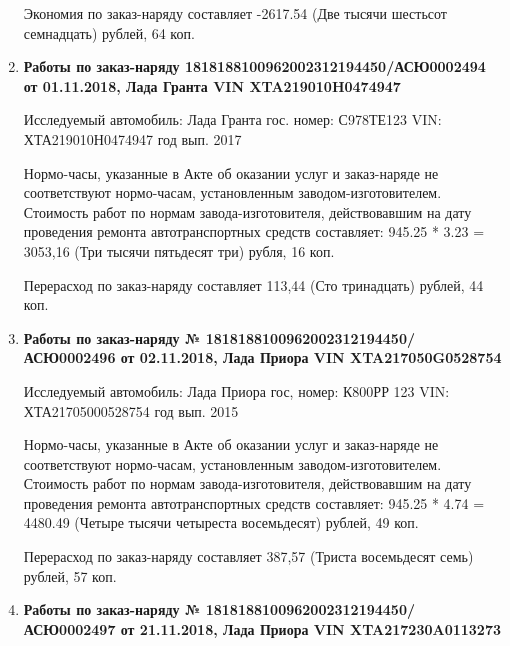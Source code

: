 \begin{enumerate}
Экономия по заказ-наряду составляет -2617.54 (Две тысячи шестьсот семнадцать) рублей, 64 коп.  
\vspace{3mm}




\item \par\textbf{{Работы по заказ-наряду 1818188100962002312194450/\-АСЮ0002494 от 01.11.2018, Лада Гранта VIN XTA219010H0474947}}

Исследуемый автомобиль:  Лада Гранта гос. номер: С978ТЕ123 VIN: ХТА219010Н0474947 год вып. 2017



Нормо-часы, указанные в Акте об оказании услуг и заказ-наряде не соответствуют нормо-часам,  установленным заводом-изготовителем.\\
Стоимость работ по нормам завода-изготовителя, действовавшим на дату проведения ремонта автотранспортных средств составляет: 945.25 * 3.23 = 3053,16 (Три тысячи пятьдесят три) рубля, 16 коп.

Перерасход по заказ-наряду составляет 113,44 (Сто тринадцать) рублей, 44 коп.  
\vspace{3mm}




\item \par\textbf{{Работы по заказ-наряду  № 1818188100962002312194450/\-АСЮ0002496 от 02.11.2018, Лада Приора VIN XTA217050G0528754 }}

Исследуемый автомобиль:  Лада Приора гос, номер: К800РР 123 VIN: ХТА21705000528754 год вып. 2015



Нормо-часы, указанные в Акте об оказании услуг и заказ-наряде не соответствуют нормо-часам,  установленным заводом-изготовителем.\\
Стоимость работ по нормам завода-изготовителя, действовавшим на дату проведения ремонта автотранспортных средств составляет: 945.25 * 4.74 = 4480.49 (Четыре тысячи четыреста восемьдесят) рублей, 49 коп.

Перерасход по заказ-наряду составляет 387,57 (Триста восемьдесят семь) рублей, 57 коп.  
\vspace{3mm}


\item \par\textbf{{Работы по заказ-наряду  № 1818188100962002312194450/\-АСЮ0002497 от 21.11.2018, Лада Приора VIN XTA217230A0113273}}






\end{enumerate}
